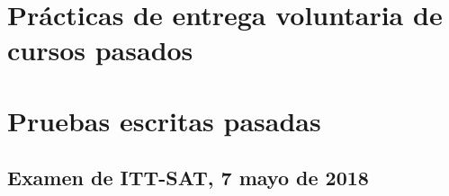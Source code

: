 \section{Prácticas de entrega voluntaria de cursos pasados}



\newpage

\section{Pruebas escritas pasadas}















































\subsection{Examen de ITT-SAT, 7 mayo de 2018}


